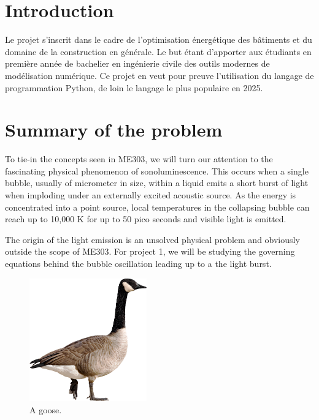 \documentclass[12pt]{article}
\begin{document}



\renewcommand{\contentsname}{Table des matières}
\renewcommand{\listfigurename}{Table des figures}
\tableofcontents
\newpage
\listoffigures
\newpage


\renewcommand\thesection{0} %
\section{Introduction}

Le projet s'inscrit dans le cadre de l'optimisation énergétique des bâtiments et du domaine de la construction en générale. Le but étant d'apporter aux étudiants en première année de bachelier en ingénierie civile des outils modernes de modélisation numérique. Ce projet en veut pour preuve l'utilisation du langage de programmation Python, de loin le langage le plus populaire en 2025.

\renewcommand\thesection{\arabic{section}} %
\setcounter{section}{0} %

\section{Summary of the problem}


To tie-in the concepts seen in ME303, we will turn our attention to the fascinating physical phenomenon of sonoluminescence. This occurs when a single bubble, usually of micrometer in size, within a liquid emits a short burst of light when imploding under an externally excited acoustic source. As the energy is concentrated into a point source, local temperatures in the collapsing bubble can reach up to 10,000 K for up to 50 pico seconds and visible light is emitted.

The origin of the light emission is an unsolved physical problem and obviously outside the scope of ME303. For project 1, we will be studying the governing equations behind the bubble oscillation leading up to a the light burst.
\begin{figure}[h!]
\centering
\includegraphics[width=0.45\textwidth]{figures/goose.png} 
\caption{A goose.}
\label{goose}
\end{figure}
\end{document}

